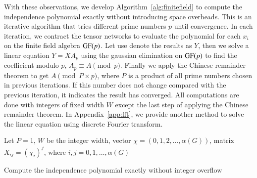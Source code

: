 \documentclass[onefignum, onetabnum]{siamart190516}
\newcommand{\<}{\langle}
\renewcommand{\>}{\rangle}
\newcommand{\App}[1]{Appendix~\ref{#1}}
\begin{document}
With these observations, we develop Algorithm~\ref{alg:finitefield} to compute the independence polynomial exactly without introducing space overheads.
This is an iterative algorithm that tries different prime numbers $p$ until convergence.
In each iteration, we contract the tensor networks to evaluate the polynomial for each $x_{i}$ on the finite field algebra ${\rm GF}(p)$.
Let use denote the results as $Y$, then we solve a linear equation $Y = X A_p$ using the gaussian elimination on ${\rm GF}(p)$ to find the coefficient modulo $p$, $A_p \equiv A \pmod p$.
Finally we apply the Chinese remainder theorem to get $A \pmod {P\times p}$, where $P$ is a product of all prime numbers chosen in previous iterations.
If this number does not change compared with the previous iteration, it indicates the result has converged.
All computations are done with integers of fixed width $W$ except the last step of applying the Chinese remainder theorem.
In \App{app:fft}, we provide another method to solve the linear equation using discrete Fourier transform.

\LinesNumberedHidden
\begin{algorithm}[!ht]
    \small
    \SetAlgoNoLine
    Let $P = 1$, $W$ be the integer width, vector $\chi = (0,1,2, \ldots, \alpha(G))$, matrix $X_{ij} = (\chi_i)^j$, where $i,j = 0, 1, \ldots, \alpha(G)$\;

    \caption{Compute the independence polynomial exactly without integer overflow}\label{alg:finitefield} 
\end{algorithm}
\end{document}
